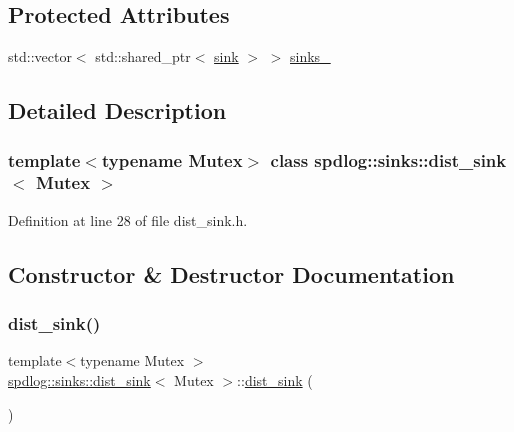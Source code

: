 \subsection*{Protected Attributes}
\begin{DoxyCompactItemize}
\item 
std\+::vector$<$ std\+::shared\+\_\+ptr$<$ \hyperlink{classspdlog_1_1sinks_1_1sink}{sink} $>$ $>$ \hyperlink{classspdlog_1_1sinks_1_1dist__sink_a3d9d8c330d7d6455f45db77d4e6977f4}{sinks\+\_\+}
\end{DoxyCompactItemize}


\subsection{Detailed Description}
\subsubsection*{template$<$typename Mutex$>$\newline
class spdlog\+::sinks\+::dist\+\_\+sink$<$ Mutex $>$}



Definition at line 28 of file dist\+\_\+sink.\+h.



\subsection{Constructor \& Destructor Documentation}
\mbox{\label{classspdlog_1_1sinks_1_1dist__sink_ab5cfe7f044b6381435eac6dc273384e5}} 
\subsubsection{\texorpdfstring{dist\+\_\+sink()}{dist\_sink()}\hspace{0.1cm}{\footnotesize\ttfamily [1/2]}}
{\footnotesize\ttfamily template$<$typename Mutex $>$ \\
\hyperlink{classspdlog_1_1sinks_1_1dist__sink}{spdlog\+::sinks\+::dist\+\_\+sink}$<$ Mutex $>$\+::\hyperlink{classspdlog_1_1sinks_1_1dist__sink}{dist\+\_\+sink} (\begin{DoxyParamCaption}{ }\end{DoxyParamCaption})\hspace{0.3cm}{\ttfamily [default]}}

